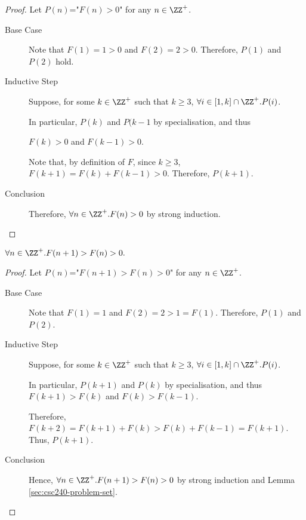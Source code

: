 \documentclass[11pt, letterpaper]{scrartcl}
\begin{document}
\begin{proof}
  \hfill

  Let $P(n)$="$F(n)>0$" for any $n\in\ZZ^{+}$.
  
  \begin{description}
  \item[Base Case] \hfill

    Note that $F(1) = 1 > 0$ and $F(2) = 2 > 0$. Therefore, $P(1)$ and $P(2)$ hold.
  \item[Inductive Step] \hfill

    Suppose, for some $k\in\ZZ^{+}$ such that $k\geq 3$, $\forall i\in[1,k]\cap \ZZ^+.P(i)$.

    In particular, $P(k)$ and $P(k-1$ by specialisation, and thus

    $F(k) > 0$ and $F(k-1) > 0$.

    Note that, by definition of $F$, since $k\geq 3$,
    $F(k+1) = F(k) + F(k-1) > 0$. Therefore, $P(k+1)$.
  \item[Conclusion]
    \hfill

    Therefore, $\forall n\in\ZZ^+.F(n) > 0$ by strong induction.

  \end{description}
\end{proof}
\begin{corollary}
  \label{sec:problem-i}
  $\forall n\in\ZZ^{+}.F(n+1)>F(n)> 0.$
\end{corollary}
\begin{proof}
  \hfill

  Let $P(n)$="$F(n+1)>F(n)> 0$" for any $n\in\ZZ^{+}$.

  \begin{description}

  \item[Base Case] \hfill

    Note that $F(1) = 1$ and $F(2) = 2 > 1 = F(1)$. Therefore, $P(1)$ and $P(2)$.
  \item[Inductive Step] \hfill

    Suppose, for some $k\in\ZZ^{+}$ such that $k\geq 3$, $\forall i\in[1,k]\cap \ZZ^+.P(i)$.

    In particular, $P(k+1)$ and $P(k)$ by specialisation, and thus
    $F(k+1) > F(k)$ and $F(k) > F(k-1)$.

    Therefore, $F(k+2) = F(k+1) + F(k) > F(k) + F(k-1) = F(k+1)$. Thus, $P(k+1)$.
  \item[Conclusion]
    \hfill

    Hence, $\forall n\in\ZZ^+.F(n+1) > F(n) > 0$ by strong induction and Lemma \ref{sec:csc240-problem-set}.

  \end{description}

\end{proof}
\end{document}
